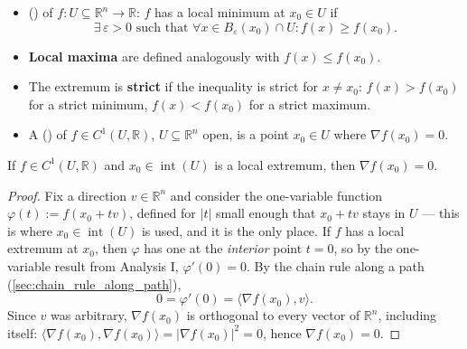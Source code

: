 \begin{definition}
\label{def:local_extrema_critical_points}
\begin{itemize}
  \item {} () of
    $f : U \subseteq \mathbb{R}^n \to \mathbb{R}$: $f$ has a local minimum at $x_0 \in U$ if
    \[\exists\,\varepsilon > 0 \text{ such that } \forall x \in B_\varepsilon(x_0)\cap U : f(x) \geq f(x_0).\]
  \item \textbf{Local maxima} are defined analogously with $f(x) \leq f(x_0)$.
  \item The extremum is \textbf{strict} if the inequality is strict for $x \neq x_0$:
    $f(x) > f(x_0)$ for a strict minimum, $f(x) < f(x_0)$ for a strict maximum.
  \item A  () of $f \in C^1(U,\mathbb{R})$,
    $U \subseteq \mathbb{R}^n$ open, is a point $x_0 \in U$ where $\nabla f(x_0) = 0$.
\end{itemize}
\end{definition}

\begin{proposition}
\label{prop:extremum_implies_critical}
If $f \in C^1(U,\mathbb{R})$ and $x_0 \in \operatorname{int}(U)$ is a local extremum, then
$\nabla f(x_0) = 0$.
\end{proposition}

\begin{proof}
Fix a direction $v \in \mathbb{R}^n$ and consider the one-variable function
$\varphi(t) := f(x_0 + tv)$, defined for $|t|$ small enough that $x_0 + tv$ stays in $U$ --- this
is where $x_0 \in \operatorname{int}(U)$ is used, and it is the only place. If $f$ has a local
extremum at $x_0$, then $\varphi$ has one at the \emph{interior} point $t=0$, so by the
one-variable result from Analysis I, $\varphi'(0) = 0$. By the chain rule along a path
(\cref{sec:chain_rule_along_path}),
\[0 = \varphi'(0) = \langle \nabla f(x_0), v\rangle.\]
Since $v$ was arbitrary, $\nabla f(x_0)$ is orthogonal to every vector of $\mathbb{R}^n$,
including itself: $\langle\nabla f(x_0),\nabla f(x_0)\rangle = |\nabla f(x_0)|^2 = 0$, hence
$\nabla f(x_0) = 0$.
\end{proof}

